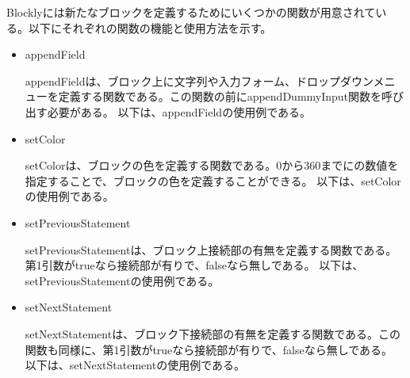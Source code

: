 \documentclass{eniepaper}
\begin{document}
Blocklyには新たなブロックを定義するためにいくつかの関数が用意されている。以下にそれぞれの関数の機能と使用方法を示す。

\begin{itemize}

\item appendField

appendFieldは、ブロック上に文字列や入力フォーム、ドロップダウンメニューを定義する関数である。この関数の前にappendDummyInput関数を呼び出す必要がある。
以下は、appendFieldの使用例である。


\item setColor

setColorは、ブロックの色を定義する関数である。0から360までにの数値を指定することで、ブロックの色を定義することができる。
以下は、setColorの使用例である。


\item setPreviousStatement

setPreviousStatementは、ブロック上接続部の有無を定義する関数である。第1引数がtrueなら接続部が有りで、falseなら無しである。
以下は、setPreviousStatementの使用例である。


\item setNextStatement

setNextStatementは、ブロック下接続部の有無を定義する関数である。この関数も同様に、第1引数がtrueなら接続部が有りで、falseなら無しである。
以下は、setNextStatementの使用例である。



\end{itemize}
\end{document}

